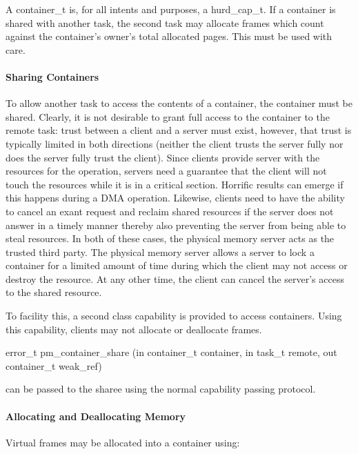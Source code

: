 A container\_t is, for all intents and purposes, a hurd\_cap\_t.  If a
container is shared with another task, the second task may allocate
frames which count against the container's owner's total allocated
pages.  This must be used with care.

\paragraph{Sharing Containers}

To allow another task to access the contents of a container, the
container must be shared.  Clearly, it is not desirable to grant full
access to the container to the remote task: trust between a client and
a server must exist, however, that trust is typically limited in both
directions (neither the client trusts the server fully nor does the
server fully trust the client).  Since clients provide server with the
resources for the operation, servers need a guarantee that the client
will not touch the resources while it is in a critical section.
Horrific results can emerge if this happens during a DMA operation.
Likewise, clients need to have the ability to cancel an exant request
and reclaim shared resources if the server does not answer in a timely
manner thereby also preventing the server from being able to steal
resources.  In both of these cases, the physical memory server acts as
the trusted third party.  The physical memory server allows a server
to lock a container for a limited amount of time during which the
client may not access or destroy the resource.  At any other time, the
client can cancel the server's access to the shared resource.

To facility this, a second class capability is provided to access
containers.  Using this capability, clients may not allocate or
deallocate frames.

\begin{code}
error\_t pm\_container\_share (in container\_t container, in task\_t
remote, out container\_t weak\_ref)
\end{code}

\noindent
{} can be passed to the sharee using the normal
capability passing protocol.

\paragraph{Allocating and Deallocating Memory}

Virtual frames may be allocated into a container using:

